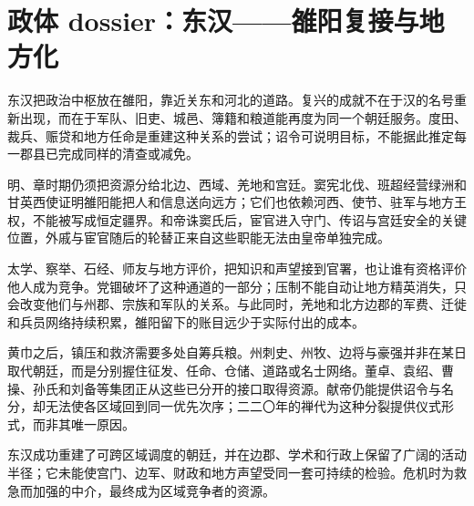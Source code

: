 \section{政体 dossier：东汉——雒阳复接与地方化}
\label{sec:polity-eastern-han}

东汉把政治中枢放在雒阳，靠近关东和河北的道路。复兴的成就不在于汉的名号重新出现，而在于军队、旧吏、城邑、簿籍和粮道能再度为同一个朝廷服务。度田、裁兵、赈贷和地方任命是重建这种关系的尝试；诏令可说明目标，不能据此推定每一郡县已完成同样的清查或减免。

明、章时期仍须把资源分给北边、西域、羌地和宫廷。窦宪北伐、班超经营绿洲和甘英西使证明雒阳能把人和信息送向远方；它们也依赖河西、使节、驻军与地方王权，不能被写成恒定疆界。和帝诛窦氏后，宦官进入守门、传诏与宫廷安全的关键位置，外戚与宦官随后的轮替正来自这些职能无法由皇帝单独完成。

太学、察举、石经、师友与地方评价，把知识和声望接到官署，也让谁有资格评价他人成为竞争。党锢破坏了这种通道的一部分；压制不能自动让地方精英消失，只会改变他们与州郡、宗族和军队的关系。与此同时，羌地和北方边郡的军费、迁徙和兵员网络持续积累，雒阳留下的账目远少于实际付出的成本。

黄巾之后，镇压和救济需要多处自筹兵粮。州刺史、州牧、边将与豪强并非在某日取代朝廷，而是分别握住征发、任命、仓储、道路或名士网络。董卓、袁绍、曹操、孙氏和刘备等集团正从这些已分开的接口取得资源。献帝仍能提供诏令与名分，却无法使各区域回到同一优先次序；二二〇年的禅代为这种分裂提供仪式形式，而非其唯一原因。

\begin{turningpoint}[东汉政体的得失]
东汉成功重建了可跨区域调度的朝廷，并在边郡、学术和行政上保留了广阔的活动半径；它未能使宫门、边军、财政和地方声望受同一套可持续的检验。危机时为救急而加强的中介，最终成为区域竞争者的资源。
\end{turningpoint}

